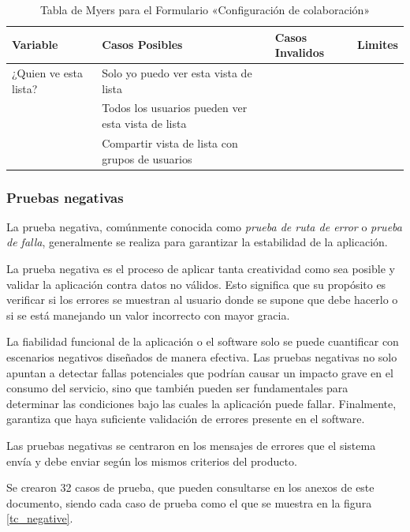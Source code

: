 \begin{table}
\centering
\begin{tabular}{|l|l|l|l|}
\hline
\footnotesize{\textbf{Variable}} & \footnotesize{\textbf{Casos Posibles}} & \footnotesize{\textbf{Casos Invalidos}} & \footnotesize{\textbf{Limites}} \\
\hline
\footnotesize{¿Quien ve esta lista?} & \footnotesize{Solo yo puedo ver esta vista de lista} & & \\
& \footnotesize{Todos los usuarios pueden ver esta vista de lista} & & \\
& \footnotesize{Compartir vista de lista con grupos de usuarios} & & \\
\hline
\end{tabular}
\caption{Tabla de Myers para el Formulario «Configuración de colaboración»}
\label{myers_09}
\end{table}

\subsubsection{Pruebas negativas}
La prueba negativa, comúnmente conocida como \emph{prueba de ruta de error} o
\emph{prueba de falla}, generalmente se realiza para garantizar la estabilidad
de la aplicación.

La prueba negativa es el proceso de aplicar tanta creatividad como sea posible y
validar la aplicación contra datos no válidos. Esto significa que su propósito
es verificar si los errores se muestran al usuario donde se supone que debe
hacerlo o si se está manejando un valor incorrecto con mayor gracia.

La fiabilidad funcional de la aplicación o el software solo se puede cuantificar
con escenarios negativos diseñados de manera efectiva. Las pruebas negativas no
solo apuntan a detectar fallas potenciales que podrían causar un impacto grave
en el consumo del servicio, sino que también pueden ser fundamentales para
determinar las condiciones bajo las cuales la aplicación puede fallar.
Finalmente, garantiza que haya suficiente validación de errores presente en el
software\cite{Nadig}.

Las pruebas negativas se centraron en los mensajes de errores que el sistema
envía y debe enviar según los mismos criterios del producto.

Se crearon 32 casos de prueba, que pueden consultarse en los anexos de este
documento, siendo cada caso de prueba como el que se muestra en la figura
\ref{tc_negative}.

